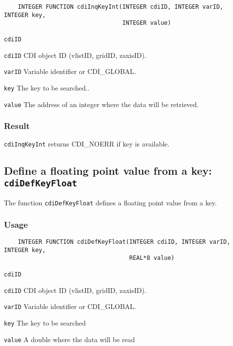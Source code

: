 \begin{verbatim}
    INTEGER FUNCTION cdiInqKeyInt(INTEGER cdiID, INTEGER varID, INTEGER key, 
                                  INTEGER value)
\end{verbatim}

\hspace*{4mm}\begin{minipage}[]{15cm}
\begin{deflist}{\texttt{cdiID}\ }
\item[\texttt{cdiID}]
CDI object ID (vlistID, gridID, zaxisID).
\item[\texttt{varID}]
Variable identifier or CDI\_GLOBAL.
\item[\texttt{key}]
The key to be searched..
\item[\texttt{value}]
The address of an integer where the data will be retrieved.

\end{deflist}
\end{minipage}

\subsubsection*{Result}

{\texttt{cdiInqKeyInt}} returns CDI\_NOERR if key is available.



\subsection{Define a floating point value from a key: \texttt{cdiDefKeyFloat}}
\label{cdiDefKeyFloat}

The function {\texttt{cdiDefKeyFloat}} defines a {\CDI} floating point value from a key.

\subsubsection*{Usage}

\begin{verbatim}
    INTEGER FUNCTION cdiDefKeyFloat(INTEGER cdiID, INTEGER varID, INTEGER key, 
                                    REAL*8 value)
\end{verbatim}

\hspace*{4mm}\begin{minipage}[]{15cm}
\begin{deflist}{\texttt{cdiID}\ }
\item[\texttt{cdiID}]
CDI object ID (vlistID, gridID, zaxisID).
\item[\texttt{varID}]
Variable identifier or CDI\_GLOBAL.
\item[\texttt{key}]
The key to be searched
\item[\texttt{value}]
A double where the data will be read

\end{deflist}
\end{minipage}

